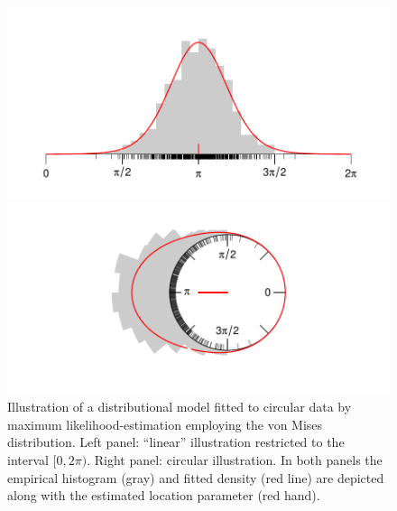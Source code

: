 \documentclass[nojss]{jss}
\numberwithin{equation}{section}
\begin{document}
\begin{figure}[t]
\begin{minipage}{.05\textwidth}
\hfill
\end{minipage}%
\begin{minipage}{.45\textwidth}
  \vspace{-1em}
  \includegraphics[width=1.05\linewidth]{density_linear.pdf}
  \end{minipage}%
\begin{minipage}{.45\textwidth}
  \includegraphics[width=1.2\linewidth]{density_circular.pdf}
\end{minipage}
\begin{minipage}{.05\textwidth}
\hfill
\end{minipage}%
\caption{Illustration of a distributional model fitted to circular data by 
  maximum likelihood-estimation employing the von Mises distribution. 
  Left panel: ``linear'' illustration restricted to the interval $[0, 2\pi)$. 
  Right panel: circular illustration.
  In both panels the empirical histogram (gray) and fitted density (red line) are depicted along 
  with the estimated location parameter (red hand).
  }
  \label{fig:densities} 
\end{figure}
\end{document}
